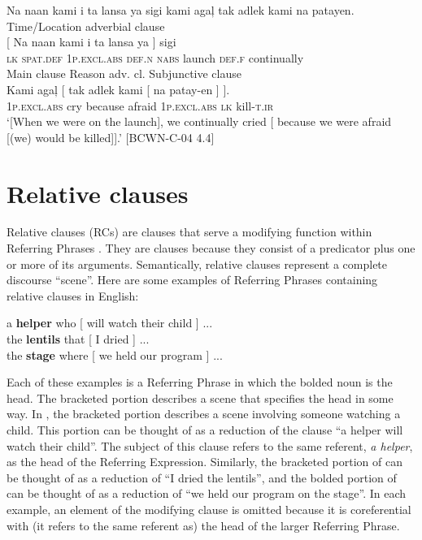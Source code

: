 \newpage
\ea
\label{bkm:Ref474847117}
Na  naan  kami  i  ta  lansa  ya  sigi  kami  agaļ tak  adlek  kami na  patayen. \smallskip\\
Time/Location adverbial clause \\
\gll {}[ Na  naan  kami  i  ta  lansa  ya  ]  sigi \\
{} \textsc{lk}  \textsc{spat.def}  1\textsc{p.excl.abs}  \textsc{def.n}  \textsc{nabs}  launch  \textsc{def.f} {}   continually \\
\glt Main clause \hspace{1cm} Reason adv. cl. \hspace{1.6cm}  Subjunctive clause \\
\gll Kami  agaļ [ tak  adlek  kami    [ na  patay-en ] ]. \\
1\textsc{p.excl.abs}  cry {} because  afraid  1\textsc{p.excl.abs} {} \textsc{lk}  kill-\textsc{t.ir} \\
\glt `[When we were on the launch], we continually cried [ because we were afraid [(we) would be killed]].’ [BCWN-C-04 4.4]
\z

\section{Relative clauses}
\label{bkm:Ref460483291} \label{sec:relativeclauses}
Relative clauses (RCs) are clauses that serve a modifying function within Referring Phrases \citep{comrie1989, payne1997}. They are clauses because they consist of a predicator plus one or more of its arguments. Semantically, relative clauses represent a complete discourse “scene”. Here are some examples of Referring Phrases containing relative clauses in English:


\ea
 \label{bkm:Ref116885896}
    \ea
    \label{bkm:Ref116885896a}
    a \textbf{helper} who [ will watch their child ] ... \\
    \ex
    \label{bkm:Ref116885896b}
    the \textbf{lentils} that [ I dried ] ... \\
    \ex
    \label{bkm:Ref116885896c}
    the \textbf{stage} where [ we held our program ] ...
    \z
\z

Each of these examples is a Referring Phrase in which the bolded noun is the head. The bracketed portion describes a scene that specifies the head in some way. In , the bracketed portion describes a scene involving someone watching a child. This portion can be thought of as a reduction of the clause “a helper will watch their child”. The subject of this clause refers to the same referent, \textit{a helper}, as the head of the Referring Expression. Similarly, the bracketed portion of  can be thought of as a reduction of “I dried the lentils”, and the bolded portion of  can be thought of as a reduction of “we held our program on the stage”. In each example, an element of the modifying clause is omitted because it is coreferential with (it refers to the same referent as) the head of the larger Referring Phrase.

